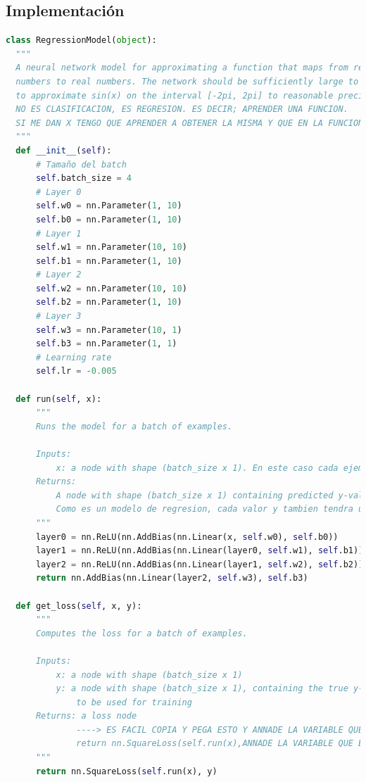 \documentclass{report}
\begin{document}
      \subsection*{Implementación}
        \begin{lstlisting}[language=Python, caption=Implementación de la regresión no lineal]
class RegressionModel(object):
  """
  A neural network model for approximating a function that maps from real
  numbers to real numbers. The network should be sufficiently large to be able
  to approximate sin(x) on the interval [-2pi, 2pi] to reasonable precision.
  NO ES CLASIFICACION, ES REGRESION. ES DECIR; APRENDER UNA FUNCION.
  SI ME DAN X TENGO QUE APRENDER A OBTENER LA MISMA Y QUE EN LA FUNCION ORIGINAL DE LA QUE QUIERO APRENDER
  """
  def __init__(self):
      # Tamaño del batch
      self.batch_size = 4
      # Layer 0
      self.w0 = nn.Parameter(1, 10)
      self.b0 = nn.Parameter(1, 10)
      # Layer 1
      self.w1 = nn.Parameter(10, 10)
      self.b1 = nn.Parameter(1, 10)
      # Layer 2
      self.w2 = nn.Parameter(10, 10)
      self.b2 = nn.Parameter(1, 10)
      # Layer 3
      self.w3 = nn.Parameter(10, 1)
      self.b3 = nn.Parameter(1, 1)
      # Learning rate
      self.lr = -0.005
      
  def run(self, x):
      """
      Runs the model for a batch of examples.

      Inputs:
          x: a node with shape (batch_size x 1). En este caso cada ejemplo solo esta compuesto por un rasgo
      Returns:
          A node with shape (batch_size x 1) containing predicted y-values.
          Como es un modelo de regresion, cada valor y tambien tendra un unico valor
      """
      layer0 = nn.ReLU(nn.AddBias(nn.Linear(x, self.w0), self.b0))
      layer1 = nn.ReLU(nn.AddBias(nn.Linear(layer0, self.w1), self.b1))
      layer2 = nn.ReLU(nn.AddBias(nn.Linear(layer1, self.w2), self.b2))
      return nn.AddBias(nn.Linear(layer2, self.w3), self.b3)
      
  def get_loss(self, x, y):
      """
      Computes the loss for a batch of examples.

      Inputs:
          x: a node with shape (batch_size x 1)
          y: a node with shape (batch_size x 1), containing the true y-values
              to be used for training
      Returns: a loss node
              ----> ES FACIL COPIA Y PEGA ESTO Y ANNADE LA VARIABLE QUE HACE FALTA PARA CALCULAR EL ERROR 
              return nn.SquareLoss(self.run(x),ANNADE LA VARIABLE QUE ES NECESARIA AQUI), para medir el error, necesitas comparar el resultado de tu prediccion con .... que?
      """
      return nn.SquareLoss(self.run(x), y)


\end{lstlisting}
\end{document}
